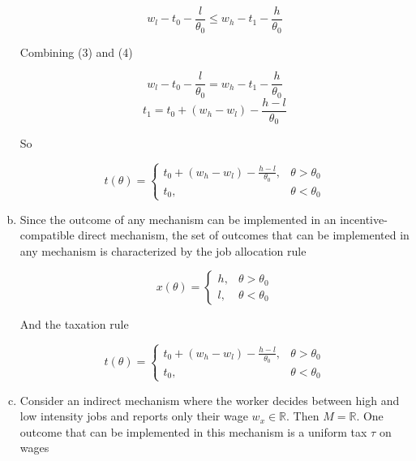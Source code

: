 \documentclass{article}
\begin{document}
\begin{enumerate}[(a)]
	\begin{equation}
		w_l - t_0 - \frac{l}{\theta_0} \leq w_h - t_1 - \frac{h}{\theta_0}
	\end{equation}

	Combining (3) and (4)

	\begin{equation*}
		w_l - t_0 - \frac{l}{\theta_0} = w_h - t_1 - \frac{h}{\theta_0}
	\end{equation*}
	\begin{equation*}
		t_1 = t_0 + (w_h - w_l) - \frac{h-l}{\theta_0}
	\end{equation*}

	So

	\begin{equation*}
	t(\theta) =  \begin{cases} 
	      t_0 + (w_h - w_l) - \frac{h-l}{\theta_0}, &\theta > \theta_0 \\
	      t_0, & \theta < \theta_0
	   \end{cases}
	\end{equation*}

	\item

	Since the outcome of any mechanism can be implemented in an incentive-compatible direct mechanism, the set of outcomes that can be implemented in any mechanism is characterized by the job allocation rule

	\begin{equation*}
	x(\theta) =  \begin{cases} 
	      h, &\theta > \theta_0 \\
	      l, & \theta < \theta_0
	   \end{cases}
	\end{equation*}

	And the taxation rule

	\begin{equation*}
	t(\theta) =  \begin{cases} 
	      t_0 + (w_h - w_l) - \frac{h-l}{\theta_0}, &\theta > \theta_0 \\
	      t_0, & \theta < \theta_0
	   \end{cases}
	\end{equation*}

	\item

	Consider an indirect mechanism where the worker decides between high and low intensity jobs and reports only their wage $w_x \in \mathbb{R}$. Then $M = \mathbb{R}$. One outcome that can be implemented in this mechanism is a uniform tax $\tau$ on wages


\end{enumerate}
\end{document}
